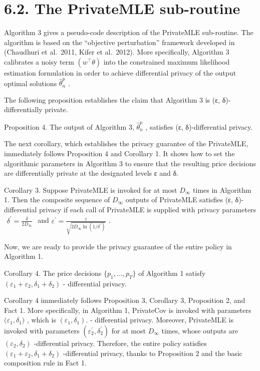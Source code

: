 \section{6.2. The PrivateMLE sub-routine}\label{the-privatemle-sub-routine}

Algorithm 3 gives a pseudo-code description of the PrivateMLE sub-routine. The algorithm is based on the ``objective perturbation'' framework developed in (Chaudhuri et al.~2011, Kifer et al.~2012). More specifically, Algorithm 3 calibrates a noisy term \(( w ^ { \top } \theta )\) into the constrained maximum likelihood estimation formulation in order to achieve differential privacy of the output optimal solutions \(\widehat { \theta } _ { n } ^ { p }\) .

The following proposition establishes the claim that Algorithm 3 is (ε, δ)-differentially private.

Proposition 4. The output of Algorithm 3, \({ \widehat { \theta } } _ { n } ^ { p }\) , satisfies (ε, δ)-differential privacy.

The next corollary, which establishes the privacy guarantee of the PrivateMLE, immediately follows Proposition 4 and Corollary 1. It shows how to set the algorithmic parameters in Algorithm 3 to ensure that the resulting price decisions are differentially private at the designated levels ε and δ.

Corollary 3. Suppose PrivateMLE is invoked for at most \(D _ { \infty }\) times in Algorithm 1. Then the composite sequence of \(D _ { \infty }\) outputs of PrivateMLE satisfies (ε, δ)-differential privacy if each call of PrivateMLE is supplied with privacy parameters \(\begin{array} { r } { \delta ^ { \prime } = \frac { \delta } { 2 D _ { \infty } } } \end{array}\) and \(\varepsilon ^ { \prime } = \frac { \varepsilon } { \sqrt { 2 D _ { \infty } \ln ( { 1 / \delta ^ { \prime } } ) } }\) .

Now, we are ready to provide the privacy guarantee of the entire policy in Algorithm 1.

Corollary 4. The price decisions \(\{ p _ { 1 } , \ldots , p _ { T } \}\) of Algorithm 1 satisfy \(( \varepsilon _ { 1 } + \varepsilon _ { 2 } , \delta _ { 1 } + \delta _ { 2 } )\) - differential privacy.

Corollary 4 immediately follows Proposition 3, Corollary 3, Proposition 2, and Fact 1. More specifically, in Algorithm 1, PrivateCov is invoked with parameters \(\big ( \varepsilon _ { 1 } , \delta _ { 1 } \big )\) , which is \(( \varepsilon _ { 1 } , \delta _ { 1 } ) .\) - differential privacy. Moreover, PrivateMLE is invoked with parameters \(( \varepsilon _ { 2 } ^ { \prime } , \delta _ { 2 } ^ { \prime } )\) for at most \(D _ { \infty }\) times, whose outputs are \(\left( \varepsilon _ { 2 } , \delta _ { 2 } \right)\) -differential privacy. Therefore, the entire policy satisfies \(( \varepsilon _ { 1 } + \varepsilon _ { 2 } , \delta _ { 1 } + \delta _ { 2 } )\) -differential privacy, thanks to Proposition 2 and the basic composition rule in Fact 1.

